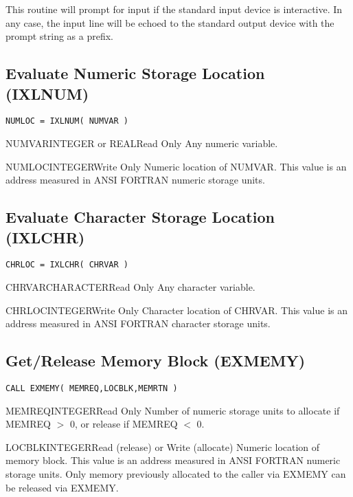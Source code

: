This routine will prompt for input if the standard input device is
interactive.  In any case, the input line will be echoed to the standard
output device with the prompt string as a prefix.


\subsection{Evaluate Numeric Storage Location (IXLNUM)}

\verb+NUMLOC = IXLNUM( NUMVAR )+

\begin{argy}{NUMVAR}{INTEGER or REAL}{Read Only}
Any numeric variable.
\end{argy}

\begin{argy}{NUMLOC}{INTEGER}{Write Only}
Numeric location of NUMVAR.  This value is an address measured in ANSI
FORTRAN numeric storage units. 
\end{argy}


\subsection{Evaluate Character Storage Location (IXLCHR)}

\verb+CHRLOC = IXLCHR( CHRVAR )+

\begin{argy}{CHRVAR}{CHARACTER}{Read Only}
Any character variable.
\end{argy}

\begin{argy}{CHRLOC}{INTEGER}{Write Only}
Character location of CHRVAR.  This value is an address measured in ANSI
FORTRAN character storage units. 
\end{argy}


\subsection{Get/Release Memory Block (EXMEMY)} \label{sec:exmemy}

\verb+CALL EXMEMY( MEMREQ,LOCBLK,MEMRTN )+

\begin{argy}{MEMREQ}{INTEGER}{Read Only}
Number of numeric storage units to allocate if MEMREQ $>$ 0, or release if
MEMREQ $<$ 0. 
\end{argy}

\begin{argy}{LOCBLK}{INTEGER}{Read (release) or Write (allocate)}
Numeric location of memory block.  This value is an address measured in ANSI
FORTRAN numeric storage units. Only memory previously allocated to the
caller via EXMEMY can be released via EXMEMY. 
\end{argy}

